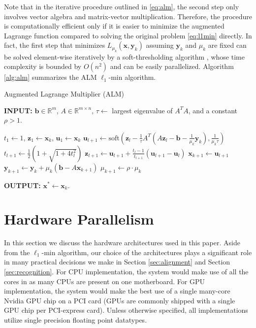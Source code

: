 \documentclass[10pt,twocolumn,letterpaper]{article}
\renewcommand{\Re}{{\mathbb{R}}}
\def\bb{{\boldsymbol{b}}}
\def\uu{{\boldsymbol{u}}}
\def\yy{{\boldsymbol{y}}}
\def\xx{{\boldsymbol{x}}}
\def\zz{{\boldsymbol{z}}}
\def\uu{{\boldsymbol{u}}}
\begin{document}
Note that in the iterative procedure outlined in \eqref{eq:alm}, the second step only involves vector algebra and matrix-vector multiplication. Therefore, the procedure is computationally efficient only if it is easier to minimize the augmented Lagrange function compared to solving the original problem \eqref{eq:l1min} directly. In fact, the first step that minimizes $L_{\mu_k} (\xx,\yy_k)$ assuming $\yy_k$ and $\mu_k$ are fixed can be solved element-wise iteratively by a soft-thresholding algorithm \cite{WrightS2008,BeckA2009}, whose time complexity is bounded by $O(n^2)$ and can be easily parallelized. Algorithm \ref{alg:alm} summarizes the ALM $\ell_1$-min algorithm.
 \begin{algorithm}[h]
\caption{Augmented Lagrange Multiplier (ALM)}
{\bf INPUT:} $\bb \in \Re^m$, $A \in \Re^{m \times n}$, $\tau\leftarrow$ largest eigenvalue of $A^TA$, and a constant $\rho>1$.
\begin{algorithmic}[1]
 \STATE $t_1 \leftarrow 1$, $\zz_1
\leftarrow \xx_k$, $\uu_1 \leftarrow \xx_k$  \STATE $\uu_{l+1}  \leftarrow
\mathrm{soft}\left(\zz_l - \frac{1}{\tau}A^T\left(A\zz_l - \bb
- \frac{1}{\mu_k}\yy_k\right), \frac{1}{\mu_k\tau}\right)$
\STATE $t_{l+1} \leftarrow \frac{1}{2}\left( 1 +
\sqrt{1+4t_l^2}\right)$ \STATE $\zz_{l+1} \leftarrow \uu_{l+1}
+ \frac{t_l - 1}{t_{l+1}}(\uu_{l+1} - \uu_l)$ \ENDWHILE \STATE$
\xx_{k+1} \leftarrow \uu_{l+1}$ \STATE $\yy_{k+1} \leftarrow
\yy_k + \mu_k (\bb - A\xx_{k+1})$ \STATE $\mu_{k+1} \leftarrow
\rho\cdot\mu_k$ \ENDWHILE 
\end{algorithmic}

{\bf OUTPUT:} $\xx^* \leftarrow \xx_k$.
\label{alg:alm}
\end{algorithm}

\section{Hardware Parallelism}
\label{sec:parallelism}
In this section we discuss the hardware architectures used in this paper. Aside from the $\ell_1$-min algorithm, our choice
of the architectures plays a significant role in many practical decisions we make in Section \ref{sec:alignment} and Section \ref{sec:recognition}.
For CPU implementation, the system would make use of all the cores in as many CPUs are present on one motherboard.  For GPU implementation, the system would
make the best use of a single many-core Nvidia GPU chip  on a PCI card (GPUs are commonly shipped with a single GPU chip per PCI-express card).  Unless otherwise specified, all implementations utilize single
precision floating point datatypes.  
\end{document}
